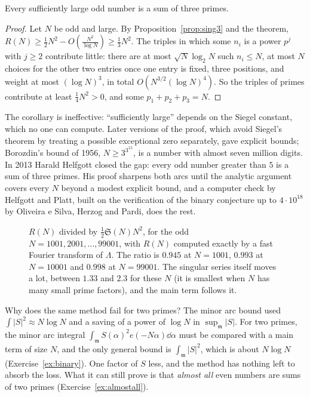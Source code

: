 \begin{corollary}[Vinogradov, 1937]\label{cor:threeprimes}
Every sufficiently large odd number is a sum of three primes.
\end{corollary}
\begin{proof}
Let $N$ be odd and large. By Proposition~\ref{prop:sing3} and the theorem, $R(N)\ge\frac12N^2-O(\frac{N^2}{\log N})\ge\frac13N^2$. The triples in which some $n_i$ is a power $p^j$ with $j\ge2$ contribute little: there are at most $\sqrt N\log_2N$ such $n_i\le N$, at most $N$ choices for the other two entries once one entry is fixed, three positions, and weight at most $(\log N)^3$, in total $O(N^{3/2}(\log N)^4)$. So the triples of primes contribute at least $\frac14N^2>0$, and some $p_1+p_2+p_3=N$.
\end{proof}

The corollary is ineffective: ``sufficiently large'' depends on the Siegel constant, which no one can compute. Later versions of the proof, which avoid Siegel's theorem by treating a possible exceptional zero separately, gave explicit bounds; Borozdin's bound of 1956, $N\ge3^{3^{15}}$, is a number with almost seven million digits. In 2013 Harald Helfgott closed the gap: every odd number greater than $5$ is a sum of three primes. His proof sharpens both arcs until the analytic argument covers every $N$ beyond a modest explicit bound, and a computer check by Helfgott and Platt, built on the verification of the binary conjecture up to $4\cdot10^{18}$ by Oliveira e Silva, Herzog and Pardi, does the rest.

\begin{figure}[ht]
\centering
{}
\caption{$R(N)$ divided by $\frac12\mathfrak S(N)N^2$, for the odd $N=1001,2001,\dots,99001$, with $R(N)$ computed exactly by a fast Fourier transform of $\Lambda$. The ratio is $0.945$ at $N=1001$, $0.993$ at $N=10001$ and $0.998$ at $N=99001$. The singular series itself moves a lot, between $1.33$ and $2.3$ for these $N$ (it is smallest when $N$ has many small prime factors), and the main term follows it.}
\label{fig:threeprimes}
\end{figure}

\begin{think}
Why does the same method fail for two primes? The minor arc bound used $\int|S|^2\approx N\log N$ and a saving of a power of $\log N$ in $\sup_{\mathfrak m}|S|$. For two primes, the minor arc integral $\int_{\mathfrak m}S(\alpha)^2e(-N\alpha)\dd\alpha$ must be compared with a main term of size $N$, and the only general bound is $\int_{\mathfrak m}|S|^2$, which is about $N\log N$ (Exercise~\ref{ex:binary}). One factor of $S$ less, and the method has nothing left to absorb the loss. What it can still prove is that \emph{almost all} even numbers are sums of two primes (Exercise~\ref{ex:almostall}).
\end{think}

